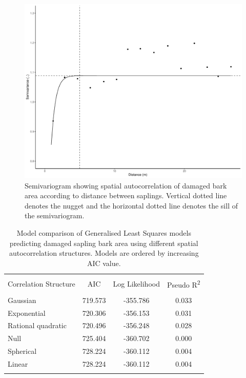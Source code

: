 \documentclass[a4paper, 11pt]{article}
\begin{document}
\begin{figure}
	\includegraphics[width=\textwidth]{semivariogram}
	\caption{Semivariogram showing spatial autocorrelation of damaged bark area according to distance between saplings. Vertical dotted line denotes the nugget and the horizontal dotted line denotes the sill of the semivariogram.}
	\label{semivariogram}
\end{figure}

\begin{table}
  \centering 
  \caption{Model comparison of Generalised Least Squares models predicting damaged sapling bark area using different spatial autocorrelation structures. Models are ordered by increasing AIC value.} 
  \label{cor_table} 
\begin{tabular}{@{\extracolsep{5pt}} lS[table-format=3.2]S[table-format=3.2]S[table-format=3.2]} 
\\[-1.8ex]\hline 
\hline \\[-1.8ex] 
Correlation Structure & {AIC} & {Log Likelihood} & {Pseudo R\textsuperscript{2}} \\ 
\hline \\[-1.8ex] 
Gaussian & 719.573 & -355.786 & 0.033 \\ 
Exponential & 720.306 & -356.153 & 0.031 \\ 
Rational quadratic & 720.496 & -356.248 & 0.028 \\ 
Null & 725.404 & -360.702 & 0.000 \\ 
Spherical & 728.224 & -360.112 & 0.004 \\ 
Linear & 728.224 & -360.112 & 0.004 \\ 
\hline \\[-1.8ex] 
\end{tabular} 
\end{table} 
\end{document}
